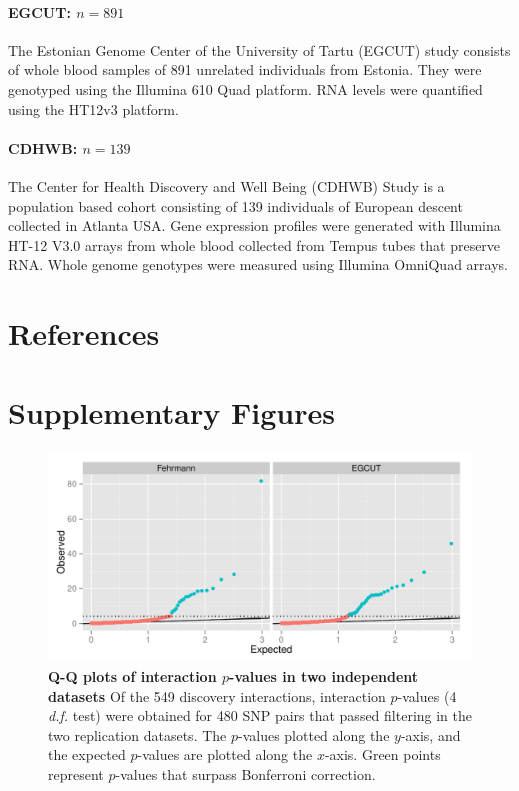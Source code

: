 \documentclass{article}
\begin{document}
\paragraph{EGCUT: $n=891$}
The Estonian Genome Center of the University of Tartu (EGCUT) study consists of whole blood samples of 891 unrelated individuals from Estonia. They were genotyped using the Illumina 610 Quad platform. RNA levels were quantified using the HT12v3 platform.

\paragraph{CDHWB: $n=139$}
The Center for Health Discovery and Well Being (CDHWB) Study is a population based cohort consisting of 139 individuals of European descent collected in Atlanta USA. Gene expression profiles were generated with Illumina HT-12 V3.0 arrays from whole blood collected from Tempus tubes that preserve RNA. Whole genome genotypes were measured using Illumina OmniQuad arrays.


\clearpage
\section{References}



\clearpage
\section{Supplementary Figures}
\setcounter{figure}{0}
\makeatletter 
\renewcommand{\thefigure}{S\@arabic\c@figure} 
\makeatletter 

\begin{figure}[H]
	\includegraphics[width=5in]{qqbonf}
	\caption{\textbf{Q-Q plots of interaction $p$-values in two independent datasets} Of the 549 discovery interactions, interaction $p$-values (4 \emph{d.f.} test) were obtained for 480 SNP pairs that passed filtering in the two replication datasets. The $p$-values plotted along the $y$-axis, and the expected $p$-values are plotted along the $x$-axis. Green points represent $p$-values that surpass Bonferroni correction.}
	\label{fig:qqplotbonf}
\end{figure}
\clearpage
\end{document}
